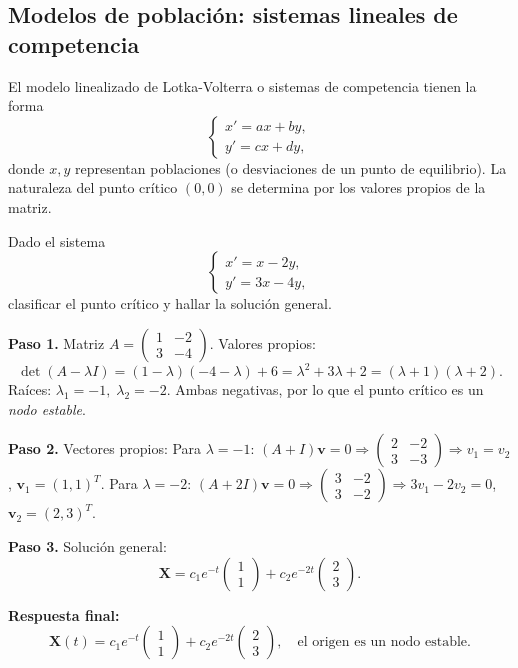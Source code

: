 \subsection{Modelos de población: sistemas lineales de competencia}

El modelo linealizado de Lotka-Volterra o sistemas de competencia tienen la forma
\[
\begin{cases}
x' = a x + b y,\\
y' = c x + d y,
\end{cases}
\]
donde $x,y$ representan poblaciones (o desviaciones de un punto de equilibrio). La naturaleza del punto crítico $(0,0)$ se determina por los valores propios de la matriz.

\begin{example}
Dado el sistema
\[
\begin{cases}
x' = x - 2y,\\
y' = 3x - 4y,
\end{cases}
\]
clasificar el punto crítico y hallar la solución general.
\begin{myproof}
\textbf{Paso 1.} Matriz $A=
\begin{pmatrix}
1&-2\\
3&-4
\end{pmatrix}$. Valores propios:
\[
\det(A-\lambda I)=(1-\lambda)(-4-\lambda)+6 = \lambda^2+3\lambda+2=(\lambda+1)(\lambda+2).
\]
Raíces: $\lambda_1=-1,\; \lambda_2=-2$. Ambas negativas, por lo que el punto crítico es un \emph{nodo estable}.

\textbf{Paso 2.} Vectores propios:
Para $\lambda=-1$: $(A+I)\mathbf{v}=0\Rightarrow
\begin{pmatrix}
2&-2\\
3&-3
\end{pmatrix}\Rightarrow v_1=v_2$, $\mathbf{v}_1=(1,1)^T$.
Para $\lambda=-2$: $(A+2I)\mathbf{v}=0\Rightarrow
\begin{pmatrix}
3&-2\\
3&-2
\end{pmatrix}\Rightarrow 3v_1-2v_2=0$, $\mathbf{v}_2=(2,3)^T$.

\textbf{Paso 3.} Solución general:
\[
\mathbf{X}=c_1 e^{-t}\begin{pmatrix}1\\1\end{pmatrix}+c_2 e^{-2t}\begin{pmatrix}2\\3\end{pmatrix}.
\]

\textbf{Respuesta final:}
\[
\boxed{
\mathbf{X}(t)=c_1 e^{-t}
\begin{pmatrix}
1\\1
\end{pmatrix}
+c_2 e^{-2t}
\begin{pmatrix}
2\\3
\end{pmatrix},
\quad \text{el origen es un nodo estable.}
}
\]
\end{myproof}
\end{example}

